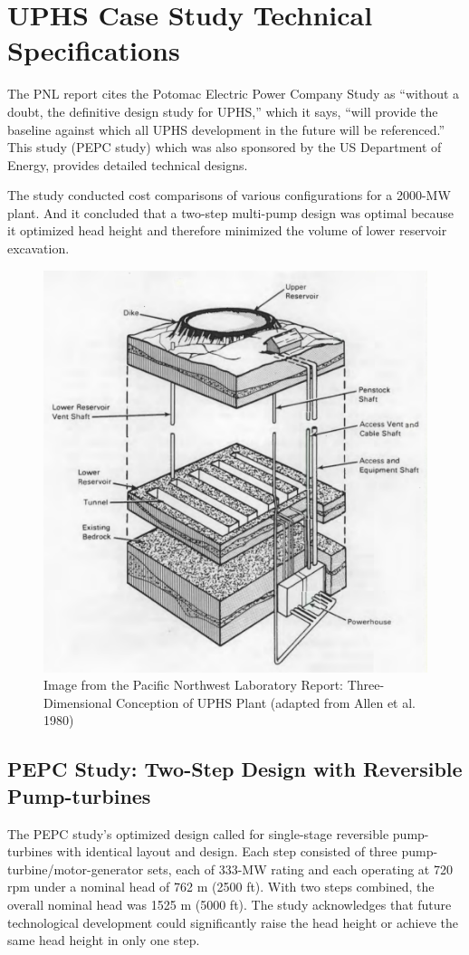 \documentclass[hidelinks,12pt,a4paper]{article}
\begin{document}
\pagebreak[4]
\section{UPHS Case Study Technical Specifications}

The PNL report cites the Potomac Electric Power Company Study as
“without a doubt, the definitive design study for UPHS,” which it says, “will provide the baseline against which all UPHS development in the future will be referenced.” This study (PEPC study) which was also sponsored by the US Department of Energy, provides detailed technical designs.

The study conducted cost comparisons of various configurations for a 2000-MW plant. And it concluded that a two-step multi-pump design was optimal because it optimized head height and therefore minimized the volume of lower reservoir excavation. \cite{UndergroundPumpedHydroelectricStorage}


\begin{figure}[ht!]
    \centering
    \includegraphics[width=.75\textwidth]{pnl-report-diagram-2.png}
    \caption{Image from the Pacific Northwest Laboratory Report: Three-Dimensional Conception of UPHS Plant (adapted from Allen et al. 1980) \cite{UndergroundPumpedHydroelectricStorage}}
\end{figure}
\FloatBarrier


\subsection{PEPC Study: Two-Step Design with Reversible Pump-turbines}
The PEPC study's optimized design called for single-stage reversible pump-turbines with identical layout and design. Each step consisted of three pump-turbine/motor-generator sets, each of 333-MW rating and each operating at 720 rpm under a nominal head of 762 m (2500 ft). With two steps combined, the overall nominal head was 1525 m (5000 ft). The study acknowledges that future technological development could significantly raise the head height or achieve the same head height in only one step.
\end{document}
